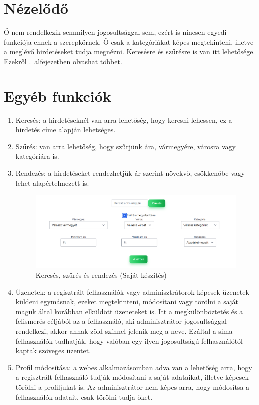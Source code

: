 \documentclass[]{thesis-ekf}
\theoremstyle{definition}
\theoremstyle{remark}
\begin{document}
	\section{Nézelődő}
		Ő nem rendelkezik semmilyen jogosultsággal sem, ezért is nincsen egyedi funkciója ennek a szerepkörnek. Ő csak a kategóriákat képes megtekinteni, illetve a meglévő hirdetéseket tudja megnézni. Keresésre és szűrésre is van itt lehetősége. Ezekről .~alfejezetben olvashat többet.
	\section{Egyéb funkciók}\label{egyeb-funkciok}
		\begin{enumerate}
			\item Keresés: a hirdetéseknél van arra lehetőség, hogy keresni lehessen, ez a hirdetés címe alapján lehetséges.
			\item Szűrés: van arra lehetőség, hogy szűrjünk ára, vármegyére, városra vagy kategóriára is.
			\item Rendezés: a hirdetéseket rendezhetjük ár szerint növekvő, csökkenőbe vagy lehet alapértelmezett is.
				\begin{figure}[ht!]
				\centering
				\includegraphics[width=13cm]{./felhasznaloi/kereses-szures}
				\caption{Keresés, szűrés és rendezés (Saját készítés)} 
				\label{kereses-szures-muvelet}
			\end{figure}
			\item Üzenetek: a regisztrált felhasználók vagy adminisztrátorok képesek üzenetek küldeni egymásnak, ezeket megtekinteni, módosítani vagy törölni a saját maguk által korábban elküldött üzeneteket is. Itt a megkülönböztetés és a felismerés céljából az a felhasználó, aki adminisztrátor jogosultsággal rendelkezi, akkor annak zöld színnel jelenik meg a neve. Ezáltal a sima felhasználók tudhatják, hogy valóban egy ilyen jogosultságú felhasználótól kaptak szöveges üzentet.
			\item Profil módosítása: a webes alkalmazásomban adva van a lehetőség arra, hogy a regisztrált felhasználó tudják módosítani a saját adataikat, illetve képesek törölni a profiljukat is. Az adminisztrátor nem képes arra, hogy módosítsa a felhasználók adatait, csak törölni tudja őket.

\end{enumerate}
\end{document}
